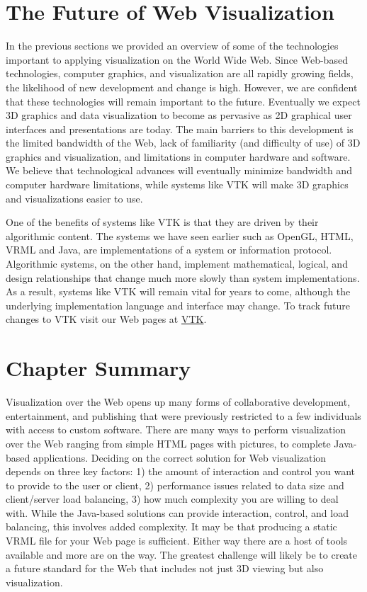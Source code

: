 \section{The Future of Web Visualization}

In the previous sections we provided an overview of some of the technologies important to applying visualization on the World Wide Web. Since Web-based technologies, computer graphics, and visualization are all rapidly growing fields, the likelihood of new development and change is high. However, we are confident that these technologies will remain important to the future. Eventually we expect 3D graphics and data visualization to become as pervasive as 2D graphical user interfaces and presentations are today. The main barriers to this development is the limited bandwidth of the Web, lack of familiarity (and difficulty of use) of 3D graphics and visualization, and limitations in computer hardware and software. We believe that technological advances will eventually minimize bandwidth and computer hardware limitations, while systems like VTK will make 3D graphics and visualizations easier to use.

One of the benefits of systems like VTK is that they are driven by their algorithmic content. The systems we have seen earlier such as OpenGL, HTML, VRML and Java, are implementations of a system or information protocol. Algorithmic systems, on the other hand, implement mathematical, logical, and design relationships that change much more slowly than system implementations. As a result, systems like VTK will remain vital for years to come, although the underlying implementation language and interface may change. To track future changes to VTK visit our Web pages at \href{https://www.vtk.org/}{VTK}.

\section{Chapter Summary}

Visualization over the Web opens up many forms of collaborative development, entertainment, and publishing that were previously restricted to a few individuals with access to custom software. There are many ways to perform visualization over the Web ranging from simple HTML pages with pictures, to complete Java-based applications. Deciding on the correct solution for Web visualization depends on three key factors: 1) the amount of interaction and control you want to provide to the user or client, 2) performance issues related to data size and client/server load balancing, 3) how much complexity you are willing to deal with. While the Java-based solutions can provide interaction, control, and load balancing, this involves added complexity. It may be that producing a static VRML file for your Web page is sufficient. Either way there are a host of tools available and more are on the way. The greatest challenge will likely be to create a future standard for the Web that includes not just 3D viewing but also visualization.


